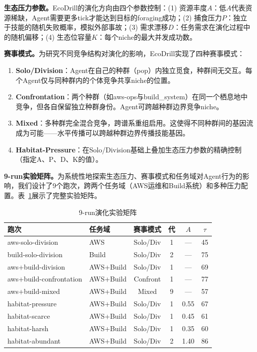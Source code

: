 \documentclass[conference]{IEEEtran}
\begin{document}
\textbf{生态压力参数。}EcoDrill的演化方向由四个参数控制：(1) 资源丰度$A$：低$A$代表资源稀缺，Agent需要更多tick才能达到目标的foraging成功；(2) 捕食压力$P$：独立于技能的随机失败概率，模拟外部事故；(3) 需求漂移$D$：任务需求在演化过程中的随机偏移；(4) 生态位容量$K$：每个niche的最大并发成功数。

\textbf{赛事模式。}为研究不同竞争结构对演化的影响，EcoDrill实现了四种赛事模式：

\begin{enumerate}
\item \textbf{Solo/Division}：Agent在自己的种群（pop）内独立觅食，种群间无交互。每个Agent仅与同种群内的个体竞争共享niche的位置。
\item \textbf{Confrontation}：两个种群（如aws-ops与build\_system）在同一个栖息地中竞争，但各自保留独立种群身份。Agent可跨越种群边界竞争niche。
\item \textbf{Mixed}：多种群完全混合竞争，跨谱系重组启用。这使得不同种群间的基因流成为可能——水平传播可以跨越种群边界传播技能基因。
\item \textbf{Habitat-Pressure}：在Solo/Division基础上叠加生态压力参数的精确控制（指定A、P、D、K的值）。
\end{enumerate}

\textbf{9-run实验矩阵。}为系统性地探索生态压力、赛事模式和任务域对Agent行为的影响，我们设计了9个跑次，跨两个任务域（AWS运维和Build系统）和多种压力配置。表~\ref{tab:config}展示了完整实验矩阵。

\begin{table}[t]
\centering
\caption{9-run演化实验矩阵}
\label{tab:config}
\setlength{\tabcolsep}{2pt}
\renewcommand{\arraystretch}{1.1}
\begin{tabular}{llcccc}
\toprule
跑次 & 任务域 & 赛事模式 & 代 & $A$ & $\tau$ \\
\midrule
aws-solo-division & AWS & Solo/Div & 1 & --- & 45 \\
build-solo-division & Build & Solo/Div & 2 & --- & 75 \\
aws+build-division & AWS+Build & Solo/Div & 1 & --- & 69 \\
aws+build-confrontation & AWS+Build & Confront & 1 & --- & 77 \\
aws+build-mixed & AWS+Build & Mixed & 9 & --- & 57 \\
habitat-pressure & AWS+Build & Solo/Div & 1 & 0.55 & 67 \\
habitat-scarce & AWS+Build & Solo/Div & 1 & 0.45 & 61 \\
habitat-harsh & AWS+Build & Solo/Div & 1 & 0.35 & 60 \\
habitat-abundant & AWS+Build & Solo/Div & 2 & 1.40 & 86 \\
\bottomrule
\end{tabular}
\end{table}
\end{document}
